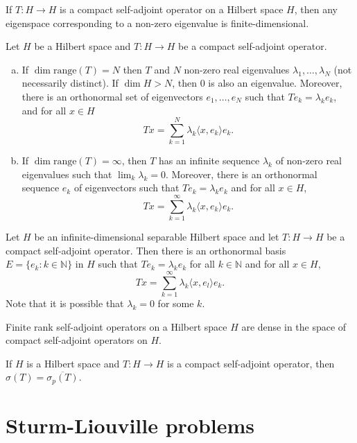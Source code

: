 \documentclass[a4paper]{article}
\newcommand{\N}{\mathbb{N}}
\newcommand{\<}{\langle}
\renewcommand{\>}{\rangle}
\newcommand{\la}{\lambda}
\newcommand{\s}{\sigma}
\newcommand{\range}{\mathrm{range}}
\begin{document}
\begin{prop}
  If $T:H\to H$ is a compact self-adjoint operator on a Hilbert space $H$, then any eigenspace corresponding to a non-zero eigenvalue is finite-dimensional.
\end{prop}

\begin{thm}
  Let $H$ be a Hilbert space and $T:H\to H$ be a compact self-adjoint operator.
  \begin{enumerate}[(a)]
    \item If $\dim\range(T)=N$ then $T$ and $N$ non-zero real eigenvalues $\la_1,\ldots,\la_N$ (not necessarily distinct). If $\dim H>N$, then $0$ is also an eigenvalue. Moreover, there is an orthonormal set of eigenvectors $e_1,\ldots,e_N$ such that $Te_k=\la_k e_k$, and for all $x\in H$
      $$ Tx = \sum_{k=1}^N\la_k\<x,e_k\>e_k.$$
    \item If $\dim\range(T)=\infty$, then $T$ has an infinite sequence $\la_k$ of non-zero real eigenvalues such that $\lim_k\la_k=0$. Moreover, there is an orthonormal sequence $e_k$ of eigenvectors such that $Te_k=\la_ke_k$ and for all $x\in H$,
      $$Tx = \sum_{k=1}^\infty \la_k\<x,e_k\>e_k.$$
  \end{enumerate}
\end{thm}

\begin{prop}
  Let $H$ be an infinite-dimensional separable Hilbert space and let $T:H\to H$ be a compact self-adjoint operator. Then there is an orthonormal basis $E=\{e_k:k\in\N\}$ in $H$ such that $Te_k=\la_ke_k$ for all $k\in\N$ and for all $x\in H$,
  $$Tx  =\sum_{k=1}^\infty\la_k\<x,e_l\>e_k.$$
  Note that it is possible that $\la_k=0$ for some $k$.
\end{prop}

\begin{prop}
  Finite rank self-adjoint operators on a Hilbert space $H$ are dense in the space of compact self-adjoint operators on $H$.
\end{prop}

\begin{thm}
  If $H$ is a Hilbert space and $T:H\to H$ is a compact self-adjoint operator, then $\s(T)=\overline{\s_p(T)}$.
\end{thm}

\section{Sturm-Liouville problems}
\end{document}
